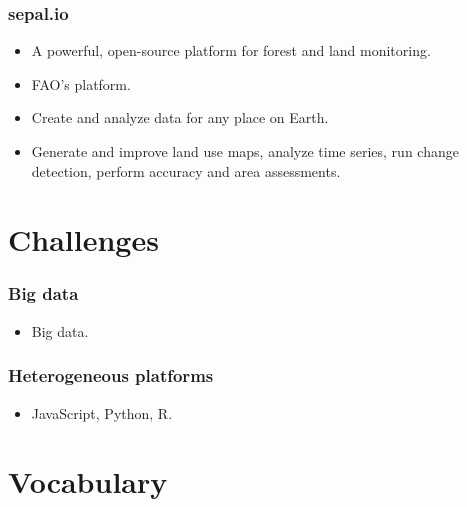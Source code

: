 \documentclass{beamer}
\begin{document}
\begin{frame}[t, allowframebreaks]
    \frametitle{sepal.io}
    \begin{itemize}
        \item A powerful, open-source platform for forest and land monitoring.
        \item FAO's platform.
        \item Create and analyze data for any place on Earth.
        \item Generate and improve land use maps, analyze time series, run
            change detection, perform accuracy and area assessments.
    \end{itemize}
\end{frame}



\section{Challenges}

\begin{frame}[t, allowframebreaks]
    \frametitle{Big data}
    \begin{itemize}
        \item Big data.
    \end{itemize}
\end{frame}



\begin{frame}[t, allowframebreaks]
    \frametitle{Heterogeneous platforms}
    \begin{itemize}
        \item JavaScript, Python, R.
    \end{itemize}
\end{frame}



\section{Vocabulary}
\end{document}
